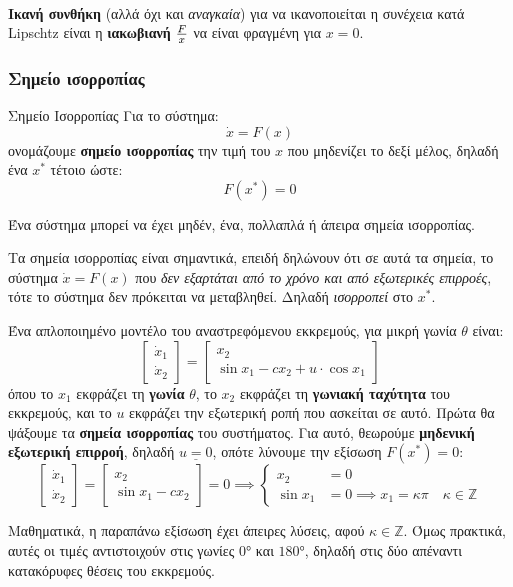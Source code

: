 \documentclass[11pt,a4paper,notitlepage,fleqn,final]{article}
\begin{document}
\paragraph{}
\textbf{Ικανή συνθήκη} (αλλά όχι και \textit{αναγκαία}) για να ικανοποιείται η συνέχεια
κατά Lipschtz είναι η \textbf{ιακωβιανή} \( \frac{F}{x} \) να είναι φραγμένη για \( x=0 \).

\subsubsection{Σημείο ισορροπίας}
\begin{defn}{Σημείο Ισορροπίας}{}
	Για το σύστημα:\[
	\dot x = F(x)
	\]
	ονομάζουμε \textbf{σημείο ισορροπίας} την τιμή του \( x \) που μηδενίζει το δεξί μέλος,
	δηλαδή ένα \( x^* \) τέτοιο ώστε:
	\[
	F(x^*) = 0
	\]
	
	Ένα σύστημα μπορεί να έχει μηδέν, ένα, πολλαπλά ή άπειρα σημεία ισορροπίας.
\end{defn}

Τα σημεία ισορροπίας είναι σημαντικά, επειδή δηλώνουν ότι σε αυτά τα σημεία, το σύστημα
\( \dot x = F(x) \) που \textit{δεν εξαρτάται από το χρόνο και από εξωτερικές επιρροές},
τότε το σύστημα δεν πρόκειται να μεταβληθεί. Δηλαδή \textit{ισορροπεί} στο \( x^* \).

\begin{exercise}[Παράδειγμα]
	Ένα απλοποιημένο μοντέλο του αναστρεφόμενου εκκρεμούς, για μικρή γωνία \( \theta \) είναι:
	\[
	\left[
	\begin{matrix}
	\dot x_1 \\ \dot x_2
	\end{matrix}
	\right] = \left[
	\begin{matrix}
	x_2 \\ \sin x_1 - cx_2 + u\cdot \cos x_1
	\end{matrix}
	\right]
	\]
	όπου το \( x_1 \) εκφράζει τη \textbf{γωνία} \( \theta \), το \( x_2 \) εκφράζει
	τη \textbf{γωνιακή ταχύτητα} του εκκρεμούς, και το \( u \) εκφράζει την εξωτερική ροπή
	που ασκείται σε αυτό.
	\tcblower
	Πρώτα θα ψάξουμε τα \textbf{σημεία ισορροπίας} του συστήματος. Για αυτό, θεωρούμε
	\textbf{μηδενική εξωτερική επιρροή}, δηλαδή \( \underline{u=0} \), οπότε λύνουμε
	την εξίσωση \( F(x^*) = 0 \):
	\[
	\left[
	\begin{matrix}
	\dot x_1 \\ \dot x_2
	\end{matrix}
	\right] = \left[\begin{matrix}
	x_2 \\ \sin x_1 - cx_2
	\end{matrix}
	\right] = 0
	\implies
	\begin{cases}
	x_2 &= 0 \\
	\sin x_1 &= 0 \implies x_1 = \kappa \pi \quad \kappa \in \mathbb Z
	\end{cases}
	\] 
	
	Μαθηματικά, η παραπάνω εξίσωση έχει άπειρες λύσεις, αφού \( \kappa \in\mathbb Z \).
	Όμως πρακτικά, αυτές οι τιμές αντιστοιχούν στις γωνίες \( \ang{0} \) και
	\( \ang{180} \), δηλαδή στις δύο απέναντι κατακόρυφες θέσεις του εκκρεμούς.
\end{exercise} 
\end{document}
